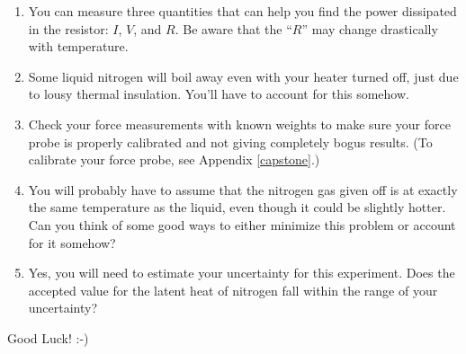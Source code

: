 \begin{enumerate}

\item You can measure three quantities that can help you find the power
dissipated in the resistor: $I$, $V$, and $R$. Be aware that the ``$\!R$'' may change drastically with temperature.

\item Some liquid nitrogen will boil away even with your heater turned off, just due to lousy thermal insulation. You'll have to account for this somehow.

\item Check your force measurements with known weights to make sure your force probe is properly calibrated and not giving completely bogus results.  (To calibrate your force probe, see Appendix \ref{capstone}.) 

\item You will probably have to assume that the nitrogen gas given off is at exactly the same temperature as the liquid, even though it could be slightly hotter. Can you think of some good ways to either minimize this problem or account for it somehow?

\item Yes, you will need to estimate your uncertainty for this experiment. Does the accepted value for the latent heat of nitrogen fall within the range of your uncertainty?

\end{enumerate}

Good Luck!  :-)
